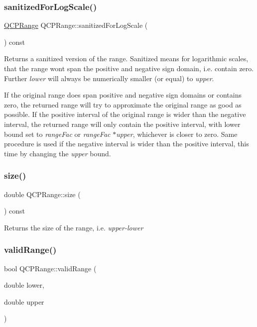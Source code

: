 \subsubsection{\texorpdfstring{sanitized\+For\+Log\+Scale()}{sanitizedForLogScale()}}
{\footnotesize\ttfamily \hyperlink{classQCPRange}{Q\+C\+P\+Range} Q\+C\+P\+Range\+::sanitized\+For\+Log\+Scale (\begin{DoxyParamCaption}{ }\end{DoxyParamCaption}) const}

Returns a sanitized version of the range. Sanitized means for logarithmic scales, that the range won\textquotesingle{}t span the positive and negative sign domain, i.\+e. contain zero. Further {\itshape lower} will always be numerically smaller (or equal) to {\itshape upper}.

If the original range does span positive and negative sign domains or contains zero, the returned range will try to approximate the original range as good as possible. If the positive interval of the original range is wider than the negative interval, the returned range will only contain the positive interval, with lower bound set to {\itshape range\+Fac} or {\itshape range\+Fac} $\ast${\itshape upper}, whichever is closer to zero. Same procedure is used if the negative interval is wider than the positive interval, this time by changing the {\itshape upper} bound. \mbox{\label{classQCPRange_a62326e7cc4316b96df6a60813230e63f}} 
\subsubsection{\texorpdfstring{size()}{size()}}
{\footnotesize\ttfamily double Q\+C\+P\+Range\+::size (\begin{DoxyParamCaption}{ }\end{DoxyParamCaption}) const\hspace{0.3cm}{\ttfamily [inline]}}

Returns the size of the range, i.\+e. {\itshape upper-\/{\itshape lower} } \mbox{\label{classQCPRange_ab38bd4841c77c7bb86c9eea0f142dcc0}} 
\subsubsection{\texorpdfstring{valid\+Range()}{validRange()}\hspace{0.1cm}{\footnotesize\ttfamily [1/2]}}
{\footnotesize\ttfamily bool Q\+C\+P\+Range\+::valid\+Range (\begin{DoxyParamCaption}\item[{double}]{lower,  }\item[{double}]{upper }\end{DoxyParamCaption})\hspace{0.3cm}{\ttfamily [static]}}

